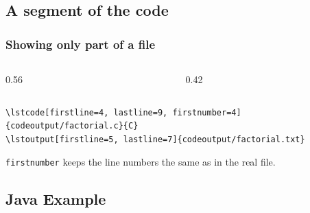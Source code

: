 \documentclass[aspectratio=169,10pt,compress]{beamer}
\begin{document}
\subsection[segment]{A segment of the code}




\begin{frame}[t,fragile] \frametitle{Showing only part of a file}
  \begin{columns}[T]
    \begin{column}{0.56\textwidth}
    \end{column}
    \begin{column}{0.42\textwidth}
    \end{column}
  \end{columns}

  \vspace{0.5em}


\begin{lstlisting}[language={[LaTeX]TeX}, basicstyle=\ttfamily\scriptsize, frame=single,
                   backgroundcolor=\color{codebg}, rulecolor=\color{gray!40}]
\lstcode[firstline=4, lastline=9, firstnumber=4]{codeoutput/factorial.c}{C}
\lstoutput[firstline=5, lastline=7]{codeoutput/factorial.txt}
\end{lstlisting}


  \small \texttt{firstnumber} keeps the line numbers the same as in the real file.
\end{frame}










\subsection[Java]{Java Example}
\end{document}
